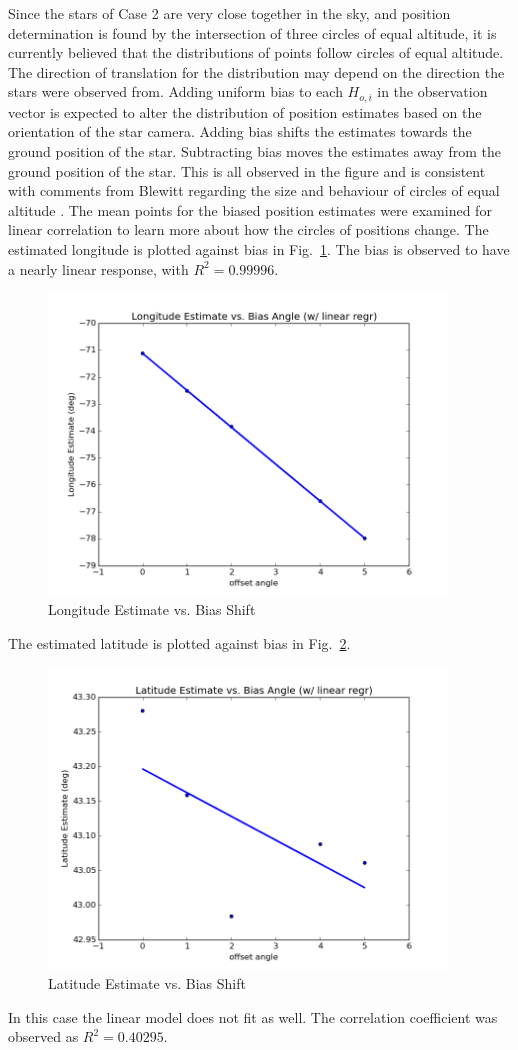 \documentclass[12pt,a4paper]{book}
\begin{document}
Since the stars of Case 2 are very close together in the sky, and position determination is found by the intersection of three circles of equal altitude, it is currently believed that the distributions of points follow circles of equal altitude.  The direction of translation for the distribution may depend on the direction the stars were observed from.  Adding uniform bias to each $H_{o,i}$ in the observation vector is expected to alter the distribution of position estimates based on the orientation of the star camera.  Adding bias shifts the estimates towards the ground position of the star.  Subtracting bias moves the estimates away from the ground position of the star.  This is all observed in the figure and is consistent with comments from Blewitt regarding the size and behaviour of circles of equal altitude \cite{b:blewitt}. 
The mean points for the biased position estimates were examined for linear correlation to learn more about how the circles of positions change.  The estimated longitude is plotted against bias in Fig.~\ref{f:biasLon}.  The bias is observed to have a nearly linear response, with $R^{2}=0.99996$.  
\begin{figure}[!htb]
\centering
\includegraphics[height=8cm]{biasLon.png}
\caption{Longitude Estimate vs. Bias Shift}
\label{f:biasLon}
\end{figure}
The estimated latitude is plotted against bias in Fig.~\ref{f:biasLat}.  
\begin{figure}[!htb]
\centering
\includegraphics[height=8cm]{biasLat.png}
\caption{Latitude Estimate vs. Bias Shift}
\label{f:biasLat}
\end{figure}
In this case the linear model does not fit as well. The correlation coefficient was observed as $R^{2} = 0.40295$.  
\FloatBarrier
\end{document}

